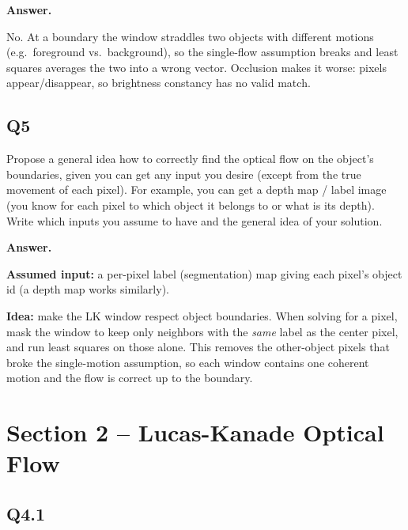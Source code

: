 \documentclass[11pt]{article}
\begin{document}
\medskip
\noindent\textbf{Answer.}

\medskip
\noindent
No. At a boundary the window straddles two objects with different motions
(e.g.\ foreground vs.\ background), so the single-flow assumption breaks and least
squares averages the two into a wrong vector. Occlusion makes it worse: pixels
appear/disappear, so brightness constancy has no valid match.


\subsection*{Q5}

Propose a general idea how to correctly find the optical flow on the object's boundaries, given you can get any input you desire (except from the true movement of each pixel). For example, you can get a depth map / label image (you know for each pixel to which object it belongs to or what is its depth). Write which inputs you assume to have and the general idea of your solution.

\medskip
\noindent\textbf{Answer.}

\medskip
\noindent
\textbf{Assumed input:} a per-pixel label (segmentation) map giving each pixel's
object id (a depth map works similarly).

\medskip
\noindent
\textbf{Idea:} make the LK window respect object boundaries. When solving for a pixel,
mask the window to keep only neighbors with the \emph{same} label as the center pixel,
and run least squares on those alone. This removes the other-object pixels that broke
the single-motion assumption, so each window contains one coherent motion and the flow
is correct up to the boundary.


\newpage
\section*{Section 2 -- Lucas-Kanade Optical Flow}

\subsection*{Q4.1}
\end{document}
